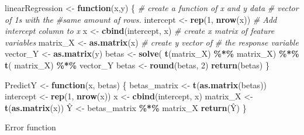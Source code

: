 \documentclass[a4paper,conference]{IEEEtran}
\newenvironment{Shaded}{\begin{snugshade}}{\end{snugshade}}
\newcommand{\CommentTok}[1]{\textcolor[rgb]{0.56,0.35,0.01}{\textit{#1}}}
\newcommand{\ControlFlowTok}[1]{\textcolor[rgb]{0.13,0.29,0.53}{\textbf{#1}}}
\newcommand{\DecValTok}[1]{\textcolor[rgb]{0.00,0.00,0.81}{#1}}
\newcommand{\FunctionTok}[1]{\textcolor[rgb]{0.13,0.29,0.53}{\textbf{#1}}}
\newcommand{\NormalTok}[1]{#1}
\newcommand{\OtherTok}[1]{\textcolor[rgb]{0.56,0.35,0.01}{#1}}
\newcommand{\SpecialCharTok}[1]{\textcolor[rgb]{0.81,0.36,0.00}{\textbf{#1}}}
\begin{document}
\begin{Shaded}
\begin{Highlighting}[]
\NormalTok{linearRegression }\OtherTok{\textless{}{-}} \ControlFlowTok{function}\NormalTok{(x,y) }
\NormalTok{  \{ }\CommentTok{\# create a function of x and y data}
  \CommentTok{\# vector of 1\textquotesingle{}s with the }
  \CommentTok{\#same amount af rows.}
\NormalTok{  intercept }\OtherTok{\textless{}{-}} \FunctionTok{rep}\NormalTok{(}\DecValTok{1}\NormalTok{, }\FunctionTok{nrow}\NormalTok{(x))}
  \CommentTok{\# Add intercept column to x}
\NormalTok{  x }\OtherTok{\textless{}{-}} \FunctionTok{cbind}\NormalTok{(intercept, x)}
  \CommentTok{\# create x matrix of feature variables}
\NormalTok{  matrix\_X }\OtherTok{\textless{}{-}} \FunctionTok{as.matrix}\NormalTok{(x) }
  \CommentTok{\# create y vector of }
  \CommentTok{\#  the response variable}
\NormalTok{  vector\_Y }\OtherTok{\textless{}{-}} \FunctionTok{as.matrix}\NormalTok{(y) }
\NormalTok{  betas  }\OtherTok{\textless{}{-}} \FunctionTok{solve}\NormalTok{(}
    \FunctionTok{t}\NormalTok{(matrix\_X) }\SpecialCharTok{\%*\%}\NormalTok{ matrix\_X) }\SpecialCharTok{\%*\%} \FunctionTok{t}\NormalTok{(}
\NormalTok{      matrix\_X) }\SpecialCharTok{\%*\%}\NormalTok{ vector\_Y}
\NormalTok{  betas }\OtherTok{\textless{}{-}} \FunctionTok{round}\NormalTok{(betas, }\DecValTok{2}\NormalTok{)}
  \FunctionTok{return}\NormalTok{(betas) }
\NormalTok{\}}

\NormalTok{PredictY }\OtherTok{\textless{}{-}} \ControlFlowTok{function}\NormalTok{(x, betas) \{}
\NormalTok{  betas\_matrix }\OtherTok{\textless{}{-}} \FunctionTok{t}\NormalTok{(}\FunctionTok{as.matrix}\NormalTok{(betas)) }
\NormalTok{  intercept }\OtherTok{\textless{}{-}} \FunctionTok{rep}\NormalTok{(}\DecValTok{1}\NormalTok{, }\FunctionTok{nrow}\NormalTok{(x))   }
\NormalTok{  x }\OtherTok{\textless{}{-}} \FunctionTok{cbind}\NormalTok{(intercept, x)   }
\NormalTok{  matrix\_X }\OtherTok{\textless{}{-}} \FunctionTok{t}\NormalTok{(}\FunctionTok{as.matrix}\NormalTok{(x))}
\NormalTok{  Ŷ }\OtherTok{\textless{}{-}}\NormalTok{ betas\_matrix }\SpecialCharTok{\%*\%}\NormalTok{ matrix\_X}
  \FunctionTok{return}\NormalTok{(Ŷ)}
\NormalTok{\} }
\end{Highlighting}
\end{Shaded}

Error function
\end{document}
